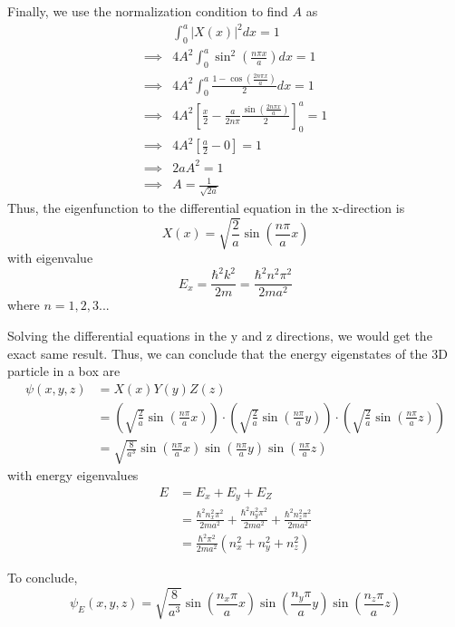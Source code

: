 \documentclass[twoside]{article}
\begin{document}
\begin{enumerate}[label=\alph*]
   Finally, we use the normalization condition to find $A$ as
   \begin{align*}
      &\int_0^a |X(x)|^2 dx = 1 \\
      \implies& 4A^2 \int_0^a \sin^2 \left( \frac{n\pi x}{a} \right) dx  = 1\\
      \implies& 4A^2 \int_0^a \frac{1 - \cos(\frac{2n\pi x}{a})}{2} dx  = 1 \\
      \implies& 4A^2 \left[ \frac{x}{2} - \frac{a}{2n\pi}\frac{\sin(\frac{2n\pi x}{a})}{2} \right]_{0}^{a}  = 1 \\
      \implies& 4A^2 \left[ \frac{a}{2} - 0 \right] = 1 \\
      \implies& 2aA^2  = 1 \\
      \implies& A  = \frac{1}{\sqrt{2a}}
   \end{align*}
   Thus, the eigenfunction to the differential equation in the x-direction is 
   \[ \boxed{X(x) = \sqrt{\frac{2}{a}} \sin\left(\frac{n\pi}{a}x\right) } \]
   with eigenvalue
   \[ \boxed{E_x = \frac{\hbar^2 k^2}{2m} = \frac{\hbar^2 n^2 \pi^2}{2ma^2}} \]
   where $n = 1,2,3...$ 


   Solving the differential equations in the y and z directions, we would get the exact same result. Thus, we can conclude that the energy eigenstates of the 3D particle in a box are 
   \begin{align*}
      \psi(x,y,z) &= X(x)Y(y)Z(z) \\
      &= \left(  \sqrt{\frac{2}{a}} \sin\left(\frac{n\pi}{a}x\right) \right) \cdot \left(  \sqrt{\frac{2}{a}} \sin\left(\frac{n\pi}{a}y\right) \right) \cdot \left(  \sqrt{\frac{2}{a}} \sin\left(\frac{n\pi}{a}z\right) \right)  \\
      &= \sqrt{\frac{8}{a^3}}\sin\left(\frac{n\pi}{a}x\right)\sin\left(\frac{n\pi}{a}y\right)\sin\left(\frac{n\pi}{a}z\right)
   \end{align*}
   with energy eigenvalues
   \begin{align*}
      E &= E_x + E_y + E_Z \\
     &= \frac{\hbar^2 n_x^2 \pi^2}{2ma^2} + \frac{\hbar^2 n_y^2 \pi^2}{2ma^2} + \frac{\hbar^2 n_z^2 \pi^2}{2ma^2} \\
     &= \frac{\hbar^2 \pi^2}{2ma^2} (n_x^2 + n_y^2 + n_z^2)
   \end{align*}
   \vskip 1cm

   To conclude,
   \[ \boxed{ \psi_E(x,y,z) = \sqrt{\frac{8}{a^3}}\sin\left(\frac{n_x\pi}{a}x\right)\sin\left(\frac{n_y\pi}{a}y\right)\sin\left(\frac{n_z\pi}{a}z\right) } \]


\end{enumerate}
\end{document}
